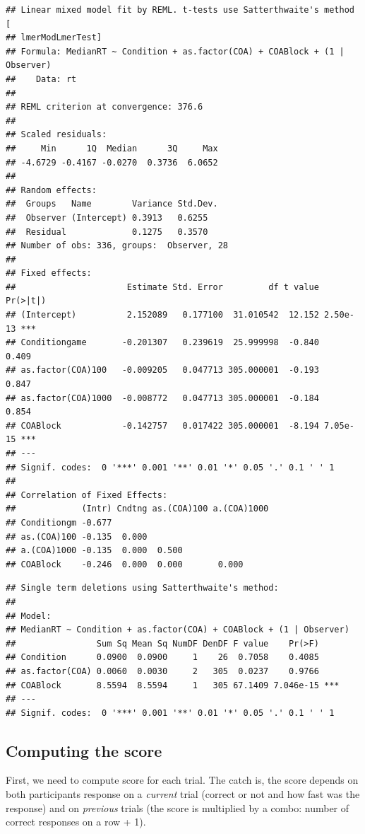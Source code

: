 \documentclass[
]{book}
\begin{document}
\begin{verbatim}
## Linear mixed model fit by REML. t-tests use Satterthwaite's method [
## lmerModLmerTest]
## Formula: MedianRT ~ Condition + as.factor(COA) + COABlock + (1 | Observer)
##    Data: rt
## 
## REML criterion at convergence: 376.6
## 
## Scaled residuals: 
##     Min      1Q  Median      3Q     Max 
## -4.6729 -0.4167 -0.0270  0.3736  6.0652 
## 
## Random effects:
##  Groups   Name        Variance Std.Dev.
##  Observer (Intercept) 0.3913   0.6255  
##  Residual             0.1275   0.3570  
## Number of obs: 336, groups:  Observer, 28
## 
## Fixed effects:
##                      Estimate Std. Error         df t value Pr(>|t|)    
## (Intercept)          2.152089   0.177100  31.010542  12.152 2.50e-13 ***
## Conditiongame       -0.201307   0.239619  25.999998  -0.840    0.409    
## as.factor(COA)100   -0.009205   0.047713 305.000001  -0.193    0.847    
## as.factor(COA)1000  -0.008772   0.047713 305.000001  -0.184    0.854    
## COABlock            -0.142757   0.017422 305.000001  -8.194 7.05e-15 ***
## ---
## Signif. codes:  0 '***' 0.001 '**' 0.01 '*' 0.05 '.' 0.1 ' ' 1
## 
## Correlation of Fixed Effects:
##             (Intr) Cndtng as.(COA)100 a.(COA)1000
## Conditiongm -0.677                               
## as.(COA)100 -0.135  0.000                        
## a.(COA)1000 -0.135  0.000  0.500                 
## COABlock    -0.246  0.000  0.000       0.000
\end{verbatim}

\begin{verbatim}
## Single term deletions using Satterthwaite's method:
## 
## Model:
## MedianRT ~ Condition + as.factor(COA) + COABlock + (1 | Observer)
##                Sum Sq Mean Sq NumDF DenDF F value    Pr(>F)    
## Condition      0.0900  0.0900     1    26  0.7058    0.4085    
## as.factor(COA) 0.0060  0.0030     2   305  0.0237    0.9766    
## COABlock       8.5594  8.5594     1   305 67.1409 7.046e-15 ***
## ---
## Signif. codes:  0 '***' 0.001 '**' 0.01 '*' 0.05 '.' 0.1 ' ' 1
\end{verbatim}

\hypertarget{computing-the-score}{%
\subsection*{Computing the score}\label{computing-the-score}}

First, we need to compute score for each trial. The catch is, the score depends on both participants response on a \emph{current} trial (correct or not and how fast was the response) and on \emph{previous} trials (the score is multiplied by a combo: number of correct responses on a row + 1).
\end{document}
